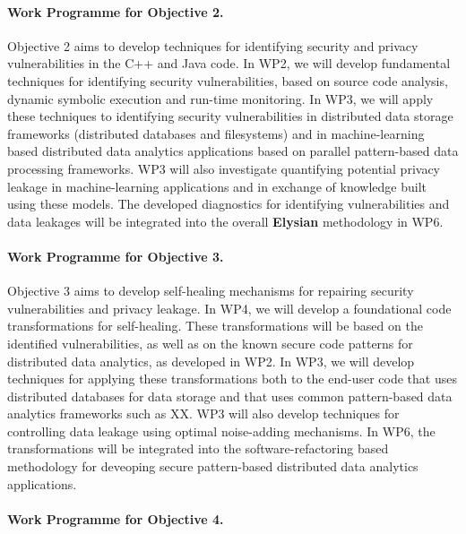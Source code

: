 \documentclass[a4paper,11pt]{article}
\newcommand{\project}[1]{\textbf{#1}\xspace}
\newcommand{\SECURITY}{\project{Elysian}}
\newcommand{\TheProject}{\SECURITY}
\begin{document}
\paragraph*{Work Programme for Objective 2.}

Objective 2 aims to develop techniques for identifying security and privacy vulnerabilities in the C++ and Java code. In WP2, we will develop fundamental techniques for identifying security vulnerabilities, based on source code analysis, dynamic symbolic execution and run-time monitoring. In WP3, we will apply these techniques to identifying security vulnerabilities in distributed data storage frameworks (distributed databases and filesystems) and in machine-learning based distributed data analytics applications based on parallel pattern-based data processing frameworks. WP3 will also investigate quantifying potential privacy leakage in machine-learning applications and in exchange of knowledge built using these models. The developed diagnostics for identifying vulnerabilities and data leakages will be integrated into the overall \TheProject{} methodology in WP6.

\paragraph{Work Programme for Objective 3.}

Objective 3 aims to develop self-healing mechanisms for repairing security vulnerabilities and privacy leakage. In WP4, we will develop a foundational code transformations for self-healing. These transformations will be based on the identified vulnerabilities, as well as on the known secure code patterns for distributed data analytics, as developed in WP2. In WP3, we will develop techniques for applying these transformations both to the end-user code that uses distributed databases for data storage and that uses common pattern-based data analytics frameworks such as XX. WP3 will also develop techniques for controlling data leakage using optimal noise-adding mechanisms. In WP6, the transformations will be integrated into the software-refactoring based methodology for deveoping secure pattern-based distributed data analytics applications. 

\paragraph{Work Programme for Objective 4.}
\end{document}
